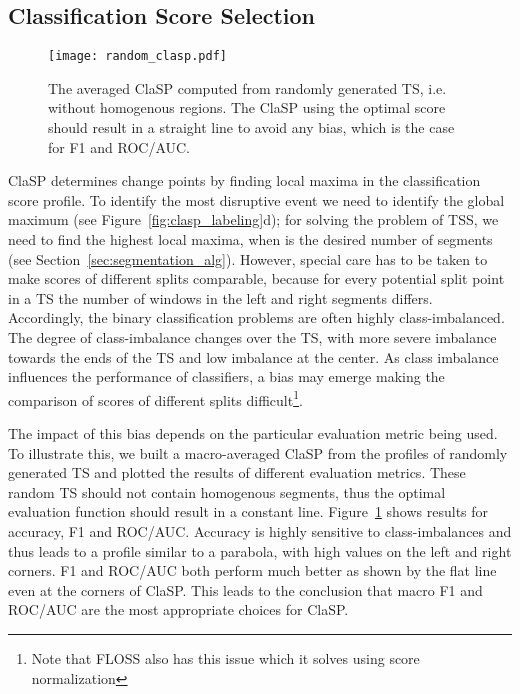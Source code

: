 \documentclass[pdflatex,sn-basic]{sn-jnl}
\begin{document}
\subsection{Classification Score Selection} \label{sec:scoring}

\begin{figure}[t]
	\texttt{[image: random\_clasp.pdf]}
	\caption{The averaged ClaSP computed from  randomly generated TS, i.e. without homogenous regions. The ClaSP using the optimal score should result in a straight line to avoid any bias, which is the case for F1 and ROC/AUC.\label{fig:ClaSP_random}
	}
\end{figure}

ClaSP determines change points by finding local maxima in the classification score profile. To identify the most disruptive event we need to identify the global maximum (see Figure~\ref{fig:clasp_labeling}d); for solving the problem of TSS, we need to find the  highest local maxima, when  is the desired number of segments (see Section~\ref{sec:segmentation_alg}). However, special care has to be taken to make scores of different splits comparable, because for every potential split point in a TS the number of windows in the left and right segments differs. Accordingly, the binary classification problems are often highly class-imbalanced. The degree of class-imbalance changes over the TS, with more severe imbalance towards the ends of the TS and low imbalance at the center. As class imbalance influences the performance of classifiers, a bias may emerge making the comparison of scores of different splits difficult\footnote{Note that FLOSS also has this issue which it solves using score normalization}. 

The impact of this bias depends on the particular evaluation metric being used. To illustrate this, we built a macro-averaged ClaSP from the profiles of  randomly generated TS and plotted the results of different evaluation metrics. These random TS should not contain homogenous segments, thus the optimal evaluation function should result in a constant line. Figure~\ref{fig:ClaSP_random} shows results for accuracy, F1 and ROC/AUC. Accuracy is highly sensitive to class-imbalances and thus leads to a profile similar to a parabola, with high values on the left and right corners. F1 and ROC/AUC both perform much better as shown by the flat line even at the corners of ClaSP. This leads to the conclusion that macro F1 and ROC/AUC are the most appropriate choices for ClaSP. 
\end{document}
